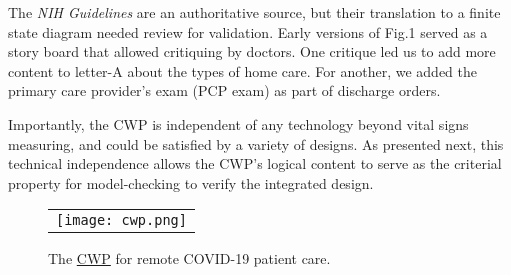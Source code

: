 The \emph{NIH Guidelines} are an authoritative source, but their translation to a finite state diagram needed review for validation. 
Early versions of Fig.1 served as a story board that allowed critiquing by doctors. 
One critique led us to add more content to letter-A about the types of home care.  
For another, we added the primary care provider's exam (PCP exam) as part of discharge orders.

Importantly, the CWP is independent of any technology beyond vital signs measuring, and could be satisfied by a variety of designs.  
As presented next, this technical independence allows the CWP's logical content to serve as the criterial property for model-checking to verify the integrated design.

\begin{figure}[t]
  \begin{center}
    \begin{tabular}{c}
      \texttt{[image: cwp.png]}
    \end{tabular}
  \end{center}
\caption{The \href{https://github.com/ericmercer/SPIN-bpmn-cwp-verification-paper/blob/main/26-Oct-2021-CWP.png}{CWP} for remote COVID-19 patient care.}
\label{fig:cwp}
\end{figure}